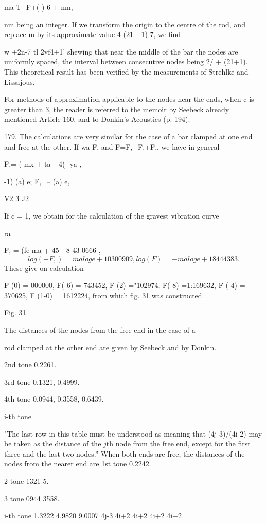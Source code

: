 ma T -F+(-) 6 + nm,

nm being an integer. If we transform the origin to the centre of the
rod, and replace m by its approximate value 4 (21+ 1) 7, we find

w +2n-7 tl 2vf4+1'
shewing that near the middle of the bar the nodes are uniformly spaced,
the interval between consecutive nodes being 2/ + (21+1). This
theoretical result has been verified by the measurements of Strehlke and
Lissajous.


For methods of approximation applicable to the nodes near the ends, when
c is greater than 3, the reader is referred to the memoir by Seebeck
already mentioned Article 160, and to Donkin's Acoustics (p. 194).

179. The calculations are very similar for the case of a bar clamped at
one end and free at the other. If wa F, and F=F,+F,+F,, we have in
general

F,= ( mx + ta +4(- ya ,

-1) (a) e; F,=-- (a) e,

V2 3 J2

If c = 1, we obtain for the calculation of the gravest vibration curve

ra

F, = (fe ma + 45 - 8 43-0666 ,
\[  log (- F,)= ma log e + 10300909, log (F) =- ma log e + 18444383.  \]
These give on calculation

F (0) = 000000, F( 6) = 743452, F (2) ="102974, F( 8) =1:169632, F (-4)
= 370625, F (1-0) = 1612224,
from which fig. 31 was constructed.

Fig. 31.

The distances of the nodes from the free end in the case of a

rod clamped at the other end are given by Seebeck and by Donkin.

2nd tone 0.2261.

3rd tone 0.1321, 0.4999.

4th tone 0.0944, 0.3558, 0.6439.

i-th tone

"The last row in this table must be understood as meaning that
(4j-3)/(4i-2) may be taken as the distance of the \(j\)th node from the free
end, except for the first three and the last two nodes.'' When both ends
are free, the distances of the nodes from the nearer end are 1st tone
0.2242.

2 tone 1321 5.

3 tone 0944 3558.

i-th tone 1.3222 4.9820 9.0007 4j-3 4i+2 4i+2 4i+2 4i+2

